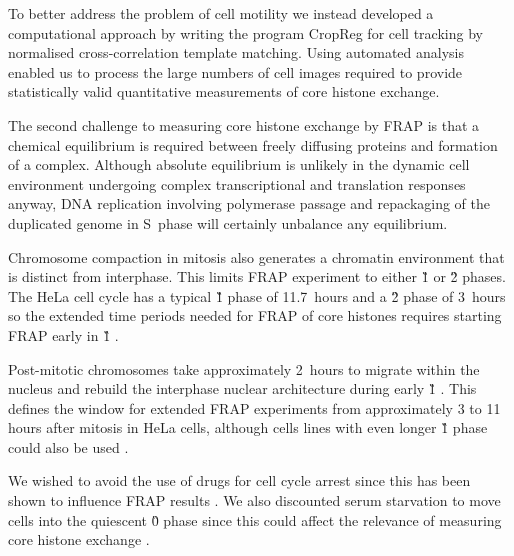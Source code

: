     To better address the problem of cell motility we
    instead developed a computational approach
    by writing the program CropReg for cell tracking by normalised
    cross-correlation template matching.
    Using automated analysis enabled us to process
    the large numbers of cell images
    required to provide statistically valid
    quantitative measurements of core histone exchange.


    The second challenge to measuring core histone exchange by FRAP is that
    a chemical equilibrium is required between freely diffusing proteins and
    formation of a complex. Although absolute equilibrium is unlikely
    in the dynamic cell environment undergoing
    complex transcriptional and translation responses anyway,
    DNA replication involving polymerase passage
    and repackaging of the duplicated genome
    in S~phase will certainly unbalance any equilibrium.

    Chromosome compaction in mitosis also generates a chromatin environment
    that is distinct from interphase.
    This limits FRAP experiment to either \G1{} or \G2{} phases.
    The HeLa cell cycle has a typical \G1{} phase of 11.7~hours
    and a \G2{} phase of 3~hours \citep{HeLaCellCycle}
    so the extended time periods needed for FRAP of core histones requires
    starting FRAP early in \G1{} .

    Post-mitotic chromosomes take approximately 2~hours
    to migrate within the nucleus
    and rebuild the interphase nuclear architecture during early \G1{}
    \citep{visualizationG1chromosomes,earlyg1position,RelativeChromosomePosition}.
    This defines the window for extended FRAP experiments
    from approximately 3 to 11 hours after mitosis
    in HeLa cells, although cells lines with even longer
    \G1{} phase could also be used \citep{PancreaticCells}.

    We wished to avoid the use of drugs for cell
    cycle arrest since this has been
    shown to influence FRAP results \citep{KimuraCook}.
    We also discounted serum starvation to move cells into the
    quiescent \G0{} phase since this could affect
    the relevance of measuring core histone
    exchange \citep{SerumStarvation}.

